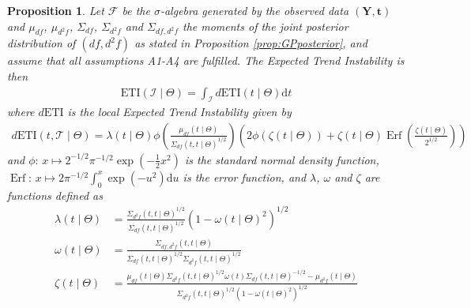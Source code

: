 \documentclass[11pt,]{article}
\DeclareMathOperator*{\Erf}{Erf}
\newtheorem{proposition}{Proposition}
\theoremstyle{nonumberplain}
\begin{document}
\begin{proposition}
Let $\mathcal{F}$ be the $\sigma$-algebra generated by the observed data $(\mathbf{Y}, \mathbf{t})$ and $\mu_{df}$, $\mu_{d^2\!f}$, $\Sigma_{df}$, $\Sigma_{d^2\!f}$ and $\Sigma_{df,d^2\!f}$ the moments of the joint posterior distribution of $(df, d^2\!f)$ as stated in Proposition \ref{prop:GPposterior}, and assume that all assumptions A1-A4 are fulfilled. The Expected Trend Instability is then
\begin{align*}
  \mathrm{ETI}(\mathcal{I} \mid \Theta) = \int_{\mathcal{I}} d\mathrm{ETI}(t \mid \Theta)\mathrm{d}t
\end{align*}
where $d\mathrm{ETI}$ is the local Expected Trend Instability given by
\begin{align*}
d\mathrm{ETI}(t, \mathcal{T} \mid \Theta) = \lambda(t \mid \Theta)\phi\left(\frac{\mu_{df}(t \mid \Theta)}{\Sigma_{df}(t,t \mid \Theta)^{1/2}}\right)\left(2\phi(\zeta(t\mid \Theta)) + \zeta(t\mid \Theta)\Erf\left(\frac{\zeta(t\mid \Theta)}{2^{1/2}}\right)\right)
\end{align*}
and $\phi\colon\, x \mapsto 2^{-1/2}\pi^{-1/2}\exp(-\frac{1}{2}x^2)$ is the standard normal density function, $\Erf\colon\, x \mapsto 2\pi^{-1/2}\int_0^x \exp(-u^2)\mathrm{d}u$ is the error function, and $\lambda$, $\omega$ and $\zeta$ are functions defined as
\begin{align*}
  \lambda(t \mid \Theta) &= \frac{\Sigma_{d^2\!f}(t,t \mid \Theta)^{1/2}}{\Sigma_{df}(t,t \mid \Theta)^{1/2}}\left(1-\omega(t \mid \Theta)^2\right)^{1/2}\\
  \omega(t \mid \Theta) &= \frac{\Sigma_{df,d^2\!f}(t,t \mid \Theta)}{\Sigma_{df}(t,t \mid \Theta)^{1/2}\Sigma_{d^2\!f}(t,t \mid \Theta)^{1/2}}\\
  \zeta(t\mid \Theta) &= \frac{\mu_{df}(t\mid \Theta)\Sigma_{d^2\!f}(t,t\mid \Theta)^{1/2}\omega(t)\Sigma_{df}(t,t\mid \Theta)^{-1/2} - \mu_{d^2\!f}(t\mid \Theta)}{\Sigma_{d^2\!f}(t,t\mid \Theta)^{1/2}\left(1 - \omega(t\mid \Theta)^2\right)^{1/2}}
\end{align*}
\label{prop:ETIposterior}
\end{proposition}
\end{document}
